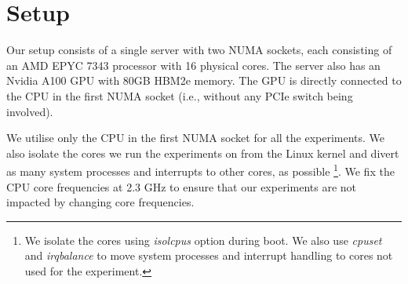 \section{Setup}
\label{sec:interconnect-sc-setup}

Our setup consists of a single server with two NUMA sockets, each consisting of an AMD EPYC 7343 processor with 16 physical cores.
The server also has an Nvidia A100 GPU with 80GB HBM2e memory.
The GPU is directly connected to the CPU in the first NUMA socket (i.e., without any PCIe switch being involved).

We utilise only the CPU in the first NUMA socket for all the experiments.
We also isolate the cores we run the experiments on from the Linux kernel and divert as many system processes and interrupts to other cores, as possible
\footnote{We isolate the cores using \textit{isolcpus} option during boot. We also use \textit{cpuset} and \textit{irqbalance} to move system processes and interrupt handling to cores not used for the experiment.}.
We fix the CPU core frequencies at 2.3 GHz to ensure that our experiments are not impacted by changing core frequencies.

